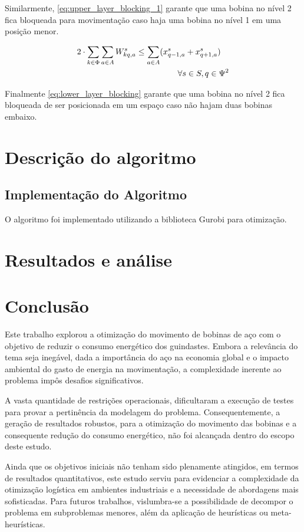 \documentclass[journal]{IEEEtran}
\begin{document}
        Similarmente, \ref{eq:upper_layer_blocking_1} garante que uma bobina no nível 2 fica 
        bloqueada para movimentação caso haja uma bobina no nível 1 em uma posição
        menor.

        \begin{align}
            2 \cdot \sum_{k \in \Phi} \sum_{a \in A} W^s_{kq,a} \leq \sum_{a \in A} (x^s_{q-1,a} + x^s_{q+1,a}) \quad \notag \\
            \forall s \in S, q \in \Psi^2
            \label{eq:lower_layer_blocking}
        \end{align}

        Finalmente \ref{eq:lower_layer_blocking} garante que uma bobina no nível 2 fica 
        bloqueada de ser posicionada em um espaço caso não hajam duas bobinas 
        embaixo. 
    \section{Descrição do algoritmo}

    \subsection{Implementação do Algoritmo}
    O algoritmo foi implementado utilizando a biblioteca Gurobi para otimização.

        
    \section{Resultados e análise}


    
    \section{Conclusão}            

    Este trabalho explorou a otimização do movimento de bobinas de aço com o objetivo de reduzir o consumo energético dos guindastes. Embora a relevância do tema seja inegável, dada a importância do aço na economia global e o impacto ambiental do gasto de energia na movimentação, a complexidade inerente ao problema impôs desafios significativos.

    A vasta quantidade de restrições operacionais, dificultaram a execução de testes para provar a pertinência da modelagem do problema. Consequentemente, a geração de resultados robustos, para a otimização do movimento das bobinas e a consequente redução do consumo energético, não foi alcançada dentro do escopo deste estudo.

    Ainda que os objetivos iniciais não tenham sido plenamente atingidos, em termos de resultados quantitativos, este estudo serviu para evidenciar a complexidade da otimização logística em ambientes industriais e a necessidade de abordagens mais sofisticadas. Para futuros trabalhos, vislumbra-se a possibilidade de decompor o problema em subproblemas menores, além da aplicação de heurísticas ou meta-heurísticas.
    
    
\end{document}

